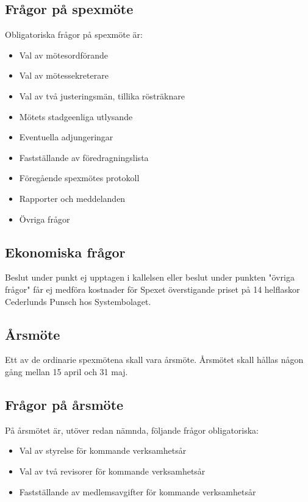 \documentclass[a4paper]{article}
\begin{document}
\subsection{Frågor på spexmöte}
Obligatoriska frågor på spexmöte är:

\begin{itemize}
  \item Val av mötesordförande
  \item Val av mötessekreterare
  \item Val av två justeringsmän, tillika rösträknare
  \item Mötets stadgeenliga utlysande
  \item Eventuella adjungeringar
  \item Fastställande av föredragningslista
  \item Föregående spexmötes protokoll
  \item Rapporter och meddelanden
  \item Övriga frågor
\end{itemize}

\subsection{Ekonomiska frågor}
Beslut under punkt ej upptagen i kallelsen eller beslut under punkten "övriga frågor" får ej medföra kostnader för Spexet överstigande priset på 14 helflaskor Cederlunds Punsch hos Systembolaget.

\subsection{Årsmöte}
Ett av de ordinarie spexmötena skall vara årsmöte. Årsmötet skall hållas någon gång mellan 15 april och 31 maj.

\subsection{Frågor på årsmöte}
På årsmötet är, utöver redan nämnda, följande frågor obligatoriska:

\begin{itemize}
  \item Val av styrelse för kommande verksamhetsår
  \item Val av två revisorer för kommande verksamhetsår
  \item Fastställande av medlemsavgifter för kommande verksamhetsår
\end{itemize}
\end{document}
